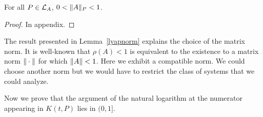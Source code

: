 \documentclass[10pt]{llncs}
\begin{document}
\begin{lemma}
\label{lyapnorm}
For all $P\in\mathcal{L}_{A}$, $0<\| A\|_P<1$. 
\end{lemma}
\begin{proof}
In appendix.
\end{proof}
%
%
%

The result presented in Lemma~\ref{lyapnorm} explains the choice of the matrix norm. It is well-known that $\rho(A)<1$ is equivalent to the existence to a matrix norm $\| \cdot\|$ for which $\| A\|<1$. Here we exhibit a compatible norm. We could choose another norm but we would have to restrict the class of systems that we could analyze.    

Now we prove that the argument of the natural logarithm at the numerator appearing in $K(t,P)$ lies in $(0,1]$. 
\end{document}
